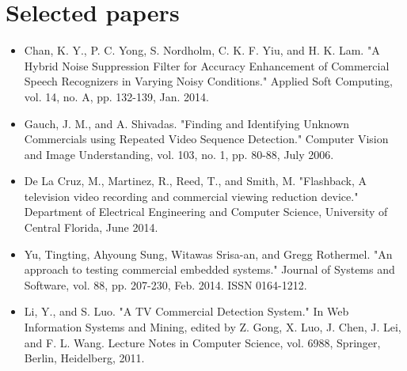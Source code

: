 \documentclass[12pt, twoside]{article}
\begin{document}
\section{Selected papers}
\begin{itemize}
\item Chan, K. Y., P. C. Yong, S. Nordholm, C. K. F. Yiu, and H. K. Lam. "A Hybrid Noise Suppression Filter for Accuracy Enhancement of Commercial Speech Recognizers in Varying Noisy Conditions." Applied Soft Computing, vol. 14, no. A, pp. 132-139, Jan. 2014.
\item Gauch, J. M., and A. Shivadas. "Finding and Identifying Unknown Commercials using Repeated Video Sequence Detection." Computer Vision and Image Understanding, vol. 103, no. 1, pp. 80-88, July 2006.
\item De La Cruz, M., Martinez, R., Reed, T., and Smith, M. "Flashback, A television video recording and commercial viewing reduction device." Department of Electrical Engineering and Computer Science, University of Central Florida, June 2014.
\item Yu, Tingting, Ahyoung Sung, Witawas Srisa-an, and Gregg Rothermel. "An approach to testing commercial embedded systems." Journal of Systems and Software, vol. 88, pp. 207-230, Feb. 2014. ISSN 0164-1212.
\item Li, Y., and S. Luo. "A TV Commercial Detection System." In Web Information Systems and Mining, edited by Z. Gong, X. Luo, J. Chen, J. Lei, and F. L. Wang. Lecture Notes in Computer Science, vol. 6988, Springer, Berlin, Heidelberg, 2011.

\end{itemize}
\end{document}
